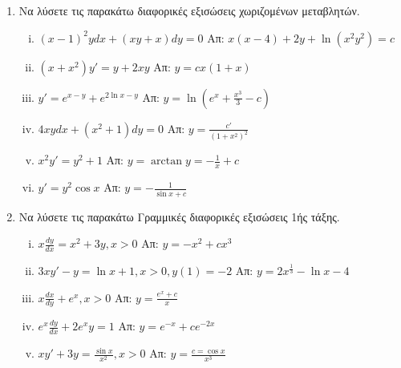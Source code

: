 \documentclass[a4paper,12pt]{article}
\begin{document}
\thispagestyle{empty}

\begin{center}
\end{center}

\vspace{\baselineskip}


\begin{enumerate}

\item Να λύσετε τις παρακάτω διαφορικές εξισώσεις χωριζομένων μεταβλητών.

\begin{enumerate}[i)]

\item $(x-1)^2ydx + (xy+x)dy=0$ \hfill Απ: $x(x-4)+2y+\ln(x^2y^2)=c$

\item $(x+x^2)y'=y+2xy$ \hfill Απ: $y=cx(1+x)$

\item $y'=e^{x-y} + e^{2\ln x-y}$ \hfill Απ: $y=\ln (e^x +\frac{x^3}{3}-c)$

\item $4xydx+(x^2+1)dy=0$ \hfill Απ: $y=\frac{c'}{(1+x^2)^2}$

\item $x^2y'=y^2+1$ \hfill Απ: $y=\arctan y = -\frac{1}{x}+c$

\item $y'=y^2\cos x$ \hfill Απ: $y=-\frac{1}{\sin x +c}$

\end{enumerate}

\item Να λύσετε τις παρακάτω Γραμμικές διαφορικές εξισώσεις 1ής τάξης.

\begin{enumerate}[i)]

\item $x\frac{dy}{dx}=x^2+3y , x>0$ \hfill Απ: $y=-x^2+cx^3$

\item $3xy'-y=\ln x+1 , x>0, y(1)=-2$ \hfill Απ: $y=2x^{\frac{1}{3}}-\ln x-4$

\item $x\frac{dx}{dy}+e^x, x>0$ \hfill Απ: $y=\frac{e^x+c}{x}$

\item $e^x\frac{dy}{dx}+2e^xy=1$ \hfill Απ: $y=e^{-x}+ce^{-2x}$

\item $xy'+3y=\frac{\sin x}{x^2}, x>0$ \hfill Απ: $y=\frac{c=\cos x}{x^3}$


\end{enumerate}
\end{enumerate}
\end{document}
